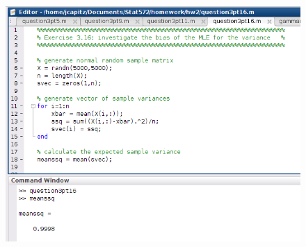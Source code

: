 \documentclass[12pt,a4paper]{article}
\begin{document}
\begin{figure}[ht!]
\begin{center}
\includegraphics[scale=.60]{q3pt16_code.png}
\caption{}
\label{q3pt16fig1}
\end{center}
\end{figure}
\FloatBarrier
\end{document}
